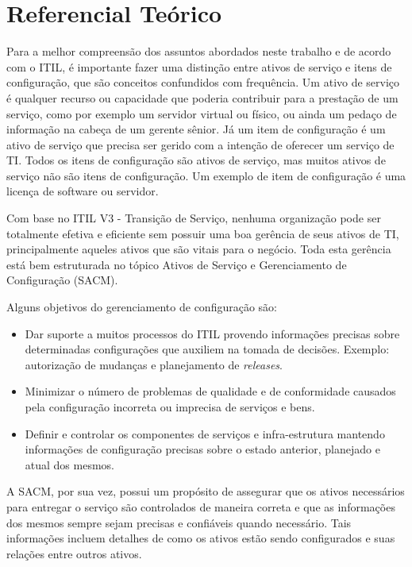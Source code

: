 \chapter{Referencial Teórico}
Para a melhor compreensão dos assuntos abordados neste trabalho e de acordo com o ITIL, é importante fazer uma distinção entre ativos de serviço e itens de configuração, que são conceitos confundidos com frequência. Um ativo de serviço é qualquer recurso ou capacidade que poderia contribuir para a prestação de um serviço, como por exemplo um servidor virtual ou físico, ou ainda um pedaço de informação na cabeça de um gerente sênior. Já um item de configuração é um ativo de serviço que precisa ser gerido com a intenção de oferecer um serviço de TI. Todos os itens de configuração são ativos de serviço, mas muitos ativos de serviço não são itens de configuração. Um exemplo de item de configuração é uma licença	 de software ou servidor.

Com base no ITIL V3 - Transição de Serviço, nenhuma organização pode ser totalmente efetiva e eficiente sem possuir uma boa gerência de seus ativos de TI, principalmente aqueles ativos que são vitais para o negócio. Toda esta gerência está bem estruturada no tópico Ativos de Serviço e Gerenciamento de Configuração (SACM).

Alguns objetivos do gerenciamento de configuração são:

\begin{itemize}
\item Dar suporte a muitos processos do ITIL provendo informações precisas sobre determinadas configurações que auxiliem na tomada de decisões. Exemplo: autorização de mudanças e planejamento de \textit{releases}.
\item Minimizar o número de problemas de qualidade e de conformidade causados ​​pela configuração incorreta ou imprecisa de serviços e bens.
\item Definir e controlar os componentes de serviços e infra-estrutura mantendo informações de configuração precisas sobre o estado anterior, planejado e atual dos mesmos.
\end{itemize}

A SACM, por sua vez, possui um propósito de assegurar que os ativos necessários para entregar o serviço são controlados de maneira correta e que as informações dos mesmos sempre sejam precisas e confiáveis quando necessário. Tais informações incluem detalhes de como os ativos estão sendo configurados e suas relações entre outros ativos.

